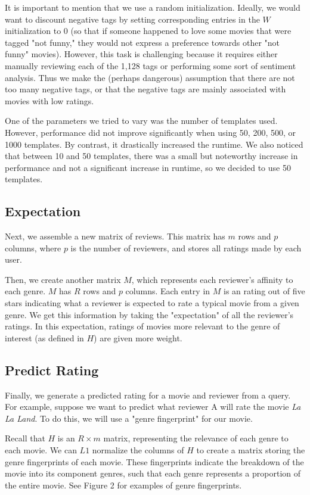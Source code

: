 \documentclass[letterpaper, 10 pt, conference]{ieeeconf}  %
\begin{document}
It is important to mention that we use a random initialization. Ideally, we would want to discount negative tags by setting corresponding entries in the $W$ initialization to 0 (so that if someone happened to love some movies that were tagged "not funny," they would not express a preference towards other "not funny" movies). However, this task is challenging because it requires either manually reviewing each of the 1,128 tags or performing some sort of sentiment analysis. Thus we make the (perhaps dangerous) assumption that there are not too many negative tags, or that the negative tags are mainly associated with movies with low ratings.

One of the parameters we tried to vary was the number of templates used. However, performance did not improve significantly when using 50, 200, 500, or 1000 templates. By contrast, it drastically increased the runtime. We also noticed that between 10 and 50 templates, there was a small but noteworthy increase in performance and not a significant increase in runtime, so we decided to use 50 templates.

\subsection{Expectation}

Next, we assemble a new matrix of reviews. This matrix has $m$ rows and $p$ columns, where $p$ is the number of reviewers, and stores all ratings made by each user.

Then, we create another matrix $M$, which represents each reviewer's affinity to each genre. 
$M$ has $R$ rows and $p$ columns. Each entry in $M$ is an rating out of five stars indicating what a reviewer is expected to rate a typical movie from a given genre.
We get this information by taking the "expectation" of all the reviewer's ratings. In this expectation, ratings of movies more relevant to the genre of interest (as defined in $H$) are given more weight.

\subsection{Predict Rating}
Finally, we generate a predicted rating for a movie and reviewer from a query. For example, suppose we want to predict what reviewer A will rate the movie \textit{La La Land}. To do this, we will use a "genre fingerprint" for our movie.

Recall that $H$ is an $R \times m$ matrix, representing the relevance of each genre to each movie. We can $L1$ normalize the columns of $H$ to create a matrix storing the genre fingerprints of each movie.
These fingerprints indicate the breakdown of the movie into its component genres, such that each genre represents a proportion of the entire movie. See Figure 2 for examples of genre fingerprints.
\end{document}
